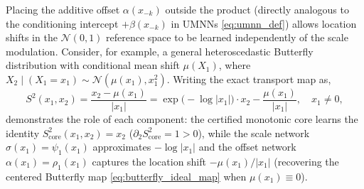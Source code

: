 \documentclass[11pt,a4paper]{article}
\theoremstyle{plain}
\theoremstyle{definition}
\theoremstyle{remark}
\begin{document}
Placing the additive offset $\alpha(x_{-k})$ outside the product (directly analogous to the conditioning intercept $+\beta(x_{-k})$ in UMNNs \eqref{eq:umnn_def}) allows location shifts in the $\mathcal{N}(0, 1)$ reference space to be learned independently of the scale modulation. Consider, for example, a general heteroscedastic Butterfly distribution with conditional mean shift $\mu(X_1)$, where $X_2 \mid (X_1 = x_1) \sim \mathcal{N}(\mu(x_1), x_1^2)$. Writing the exact transport map as,
\begin{equation}
    S^2(x_1, x_2) = \frac{x_2 - \mu(x_1)}{|x_1|} = \exp\big(-\log|x_1|\big) \cdot x_2 - \frac{\mu(x_1)}{|x_1|}, \quad x_1 \neq 0,
    \label{eq:butterfly_sm_decomp}
\end{equation}
demonstrates the role of each component: the certified monotonic core learns the identity $S^2_{\text{core}}(x_1, x_2) = x_2$ ($\partial_2 S^2_{\text{core}} = 1 > 0$), while the scale network $\sigma(x_1) = \psi_1(x_1)$ approximates $-\log|x_1|$ and the offset network $\alpha(x_1) = \rho_1(x_1)$ captures the location shift $-\mu(x_1)/|x_1|$ (recovering the centered Butterfly map \eqref{eq:butterfly_ideal_map} when $\mu(x_1) \equiv 0$).
\end{document}
